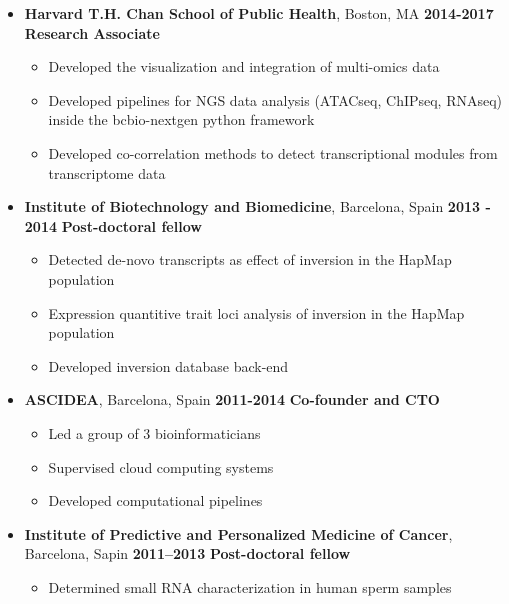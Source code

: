 \begin{itemize}
\item
  \textbf{Harvard T.H. Chan School of Public Health}, Boston, MA \hfill \textbf{2014-2017}
  \newline
  \textbf{Research Associate}

  \begin{itemize}
  \tightlist
  \item Developed the visualization and integration of multi-omics data
  \item
    Developed pipelines for NGS data analysis (ATACseq, ChIPseq, RNAseq) inside the bcbio-nextgen python framework
  \item
    Developed co-correlation methods to detect transcriptional modules from transcriptome data
  \end{itemize}
\item
  \textbf{Institute of Biotechnology and Biomedicine}, Barcelona, Spain \hfill \textbf{2013 - 2014}
  \newline
  \textbf{Post-doctoral fellow}

  \begin{itemize}
  \tightlist
  \item
    Detected de-novo transcripts as effect of inversion in the HapMap population
  \item
    Expression quantitive trait loci analysis of inversion in the HapMap population
  \item
    Developed inversion database back-end
  \end{itemize}
\item
  \textbf{ASCIDEA}, Barcelona, Spain \hfill \textbf{2011-2014}
  \newline
  \textbf{Co-founder and CTO}

  \begin{itemize}
  \tightlist
  \item
    Led a group of 3 bioinformaticians
  \item
    Supervised cloud computing systems
  \item
    Developed computational pipelines
  \end{itemize}
\item
  \textbf{Institute of Predictive and Personalized Medicine of Cancer}, Barcelona, Sapin \hfill \textbf{2011--2013}
  \newline
  \textbf{Post-doctoral fellow}

  \begin{itemize}
  \tightlist
  \item
    Determined small RNA characterization in human sperm samples
  \end{itemize}
\end{itemize}

